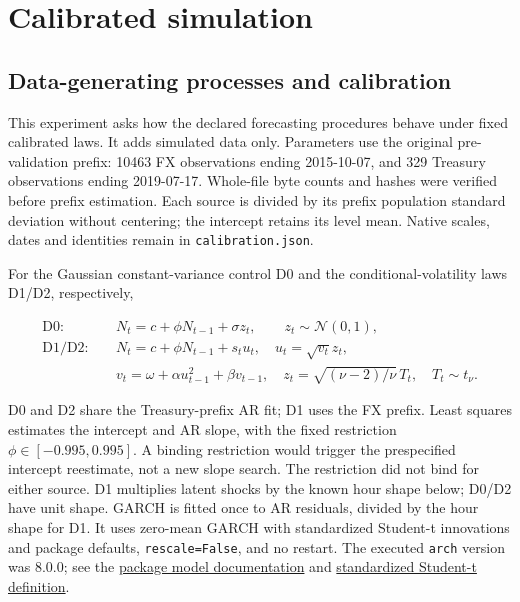 

\clearpage

\section{Calibrated simulation}\label{sup:v8-calibrated}

\subsection{Data-generating processes and calibration}\label{sup:v8-mc-calibration}

This experiment asks how the declared forecasting procedures behave under fixed calibrated laws. It adds simulated data only. Parameters use the original pre-validation prefix: 10463 FX observations ending 2015-10-07, and 329 Treasury observations ending 2019-07-17. Whole-file byte counts and hashes were verified before prefix estimation. Each source is divided by its prefix population standard deviation without centering; the intercept retains its level mean. Native scales, dates and identities remain in \texttt{calibration.json}.

For the Gaussian constant-variance control D0 and the conditional-volatility laws D1/D2, respectively,

\begin{align*}
\mathrm{D0}:\quad &N_t=c+\phi N_{t-1}+\sigma z_t,\qquad z_t\sim\mathcal N(0,1),\\
\mathrm{D1/D2}:\quad &N_t=c+\phi N_{t-1}+s_tu_t,\quad u_t=\sqrt{v_t}z_t,\\
&v_t=\omega+\alpha u_{t-1}^2+\beta v_{t-1},\quad z_t=\sqrt{(\nu-2)/\nu}\,T_t,\quad T_t\sim t_\nu.
\end{align*}

D0 and D2 share the Treasury-prefix AR fit; D1 uses the FX prefix. Least squares estimates the intercept and AR slope, with the fixed restriction $\phi\in[-0.995,0.995]$. A binding restriction would trigger the prespecified intercept reestimate, not a new slope search. The restriction did not bind for either source. D1 multiplies latent shocks by the known hour shape below; D0/D2 have unit shape. GARCH is fitted once to AR residuals, divided by the hour shape for D1. It uses zero-mean GARCH with standardized Student-t innovations and package defaults, \texttt{rescale=False}, and no restart. The executed \texttt{arch} version was 8.0.0; see the \href{https://arch.readthedocs.io/en/latest/univariate/introduction.html}{package model documentation} and \href{https://arch.readthedocs.io/en/latest/univariate/generated/arch.univariate.StudentsT.html}{standardized Student-t definition}.

